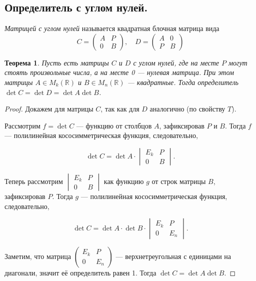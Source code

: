 \documentclass[a4paper, 12pt]{article}
\newtheorem*{zero_angle}{Теорема}
\begin{document}
\subsection{Определитель с углом нулей.}
\textit{Матрицей с углом нулей} называется квадратная блочная матрица вида
\[
C =
\begin{pmatrix}
A & P\\
0 & B
\end{pmatrix},
\quad
D =
\begin{pmatrix}
A & 0\\
P & B
\end{pmatrix}
\]
\begin{zero_angle}
Пусть есть матрицы $C$ и $D$ с углом нулей, где на месте $P$ могут стоять произвольные числа, а на месте 0 --- нулевая матрица. При этом матрицы $A \in M_k\left(\mathbb R\right)$ и $B \in M_n\left(\mathbb R\right)$ — квадратные. Тогда определитель $\det{C} = \det{D} = \det{A}\det{B}$.
\end{zero_angle}
\begin{proof}
Докажем для матрицы $C$, так как для $D$ аналогично (по свойству $T$).

Рассмотрим $f = \det{C}$ --- функцию от столбцов $A$, зафиксировав $P$ и $B$. Тогда $f$ --- полилинейная кососимметрическая функция, следовательно,

$$\det{C} = \det{A} \cdot 
\begin{vmatrix}
E_k & P\\
0 & B
\end{vmatrix}.$$

Теперь рассмотрим 
$\begin{vmatrix}
E_k & P\\
0 & B
\end{vmatrix}$ как функцию $g$ от строк матрицы $B$, зафиксировав $P$. Тогда $g$ --- полилинейная кососимметрическая функция, следовательно,

$$\det{C} = \det{A} \cdot \det{B} \cdot
\begin{vmatrix}
E_k & P\\
0 & E_n
\end{vmatrix}.$$

Заметим, что матрица
$\begin{pmatrix}
E_k & P\\
0 & E_n
\end{pmatrix}$ --- верхнетреугольная с единицами на диагонали, значит её определитель равен 1. Тогда $\det{C} = \det{A}\det{B}$.
\end{proof}
\end{document}
